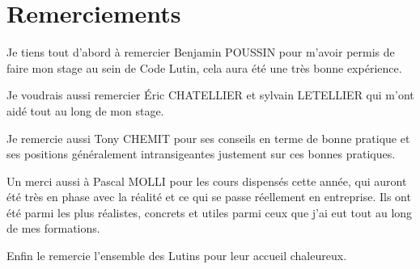 \section*{Remerciements}

Je tiens tout d'abord à remercier Benjamin POUSSIN pour m'avoir permis de faire 
mon stage au sein de Code Lutin, cela aura été une très bonne expérience.

Je voudrais aussi remercier Éric CHATELLIER et sylvain LETELLIER qui m'ont 
aidé tout au long de mon stage.

Je remercie aussi Tony CHEMIT pour ses conseils en terme de bonne pratique et ses
positions généralement intransigeantes justement sur ces bonnes pratiques.

Un merci aussi à Pascal MOLLI pour les cours dispensés cette année,
qui auront été très en phase avec la réalité et ce qui se passe réellement en 
entreprise. Ils ont été parmi les plus réalistes, concrets et utiles parmi ceux
que j'ai eut tout au long de mes formations.

Enfin le remercie l'ensemble des Lutins pour leur accueil chaleureux.
